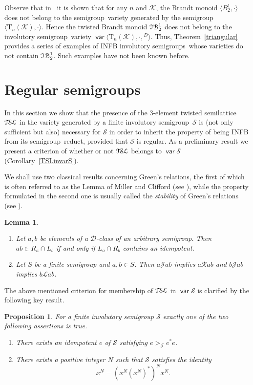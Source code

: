 \documentclass[smallextended]{svjour3}
\def\Rc{\mathrel{\mathscr{R}}}
\def\Lc{\mathrel{\mathscr{L}}}
\def\Jc{\mathrel{\mathscr{J}}}
\newcommand{\sgp}{semi\-group}
\newcommand{\is}{involutory semi\-group}
\newcommand{\iss}{involutory semi\-groups}
\newcommand{\fis}{finite involutory semi\-group}
\newcommand{\TSL}{\ensuremath{\mathcal{T\kern-.5pt S\kern-.5pt L}}}
\newcommand{\TB}{\ensuremath{\mathcal{T\kern-.5pt B}_2^1}}
\newtheorem{Prop}[Thm]{Proposition}
\newtheorem{Lemma}[Thm]{Lemma}
\DeclareMathOperator{\var}{\mathsf{var}}
\begin{document}
Observe that in~\cite{Goldberg&Volkov:2003} it is shown that for any $n$ and $\mathcal{K}$, the Brandt monoid $\langle B_2^1,\cdot\rangle$
does not belong to the \sgp\ variety generated by the \sgp\ $\langle\mathrm{T}_n(\mathcal{K}),\cdot\rangle$. Hence the twisted Brandt
monoid $\TB$ does not belong to the \is\ variety $\var\langle\mathrm{T}_n(\mathcal{K}),\cdot,{}^D\rangle$. Thus, Theorem~\ref{triangular}
provides a series of examples of INFB \iss\ whose varieties do not contain $\TB$. Such examples have not been known before.

\section{Regular semigroups}
\label{sec:regular}

In this section we show that the presence of the 3-element twisted semilattice $\TSL$ in the variety generated by a \fis\ $\mathcal{S}$ is
(not only sufficient but also) necessary for $\mathcal{S}$ in order to inherit the property of being INFB  from its \sgp\ reduct, provided
that $\mathcal{S}$ is regular. As a preliminary result we present a criterion of whether or not $\TSL$ belongs to $\var\mathcal{S}$
(Corollary~\ref{TSLinvarS}).


We shall use two classical results concerning Green's relations, the first of which is often referred
to as the Lemma of Miller and Clifford (see \cite[Proposition~2.3.7]{how}), while the property formulated
in the second one is usually called the \emph{stability} of Green's relations (see \cite[Proposition~3.1.4 (2)]{pin}).

\begin{Lemma} \label{Miller&Clifford}
\begin{enumerate}
\item Let $a,b$ be elements of a $\mathscr{D}$-class of an arbitrary \sgp. Then $ab\in R_a\cap L_b$ if and only if
$L_a\cap R_b$ contains an idempotent.
\item Let $S$ be a finite semigroup and $a,b\in S$. Then $a\Jc ab$ implies $a\Rc ab$ and $b\Jc ab$ implies $b \Lc ab$.
\end{enumerate}
\end{Lemma}

The above mentioned criterion for membership of $\TSL$ in $\var\mathcal{S}$ is clarified by the following key result.
\begin{Prop}\label{alternative} For a finite involutory semigroup $\mathcal{S}$ exactly one of the two following assertions is true.
\begin{enumerate}
\item[(A)] There exists an idempotent $e$ of $\mathcal{S}$ satisfying $e\mathrel{{>}_{\!\!\!\Jc}} e^*e$.
\item[(B)] There exists a positive integer $N$ such that  $\mathcal{S}$ satisfies the identity
\begin{equation}\label{identityfor(B)}
x^N=(x^N(x^N)^*)^Nx^N.
\end{equation}
\end{enumerate}
\end{Prop}
\end{document}
